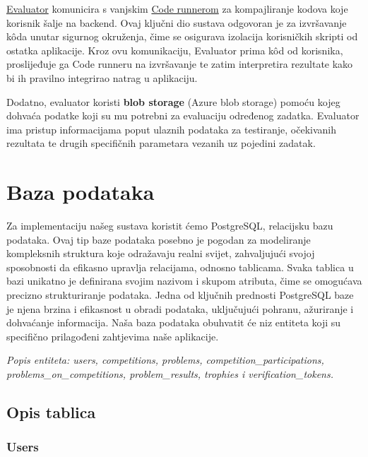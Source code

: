 	{\underline{Evaluator} komunicira s vanjskim \underline{Code runnerom} za kompajliranje kodova koje korisnik šalje
	na backend. Ovaj ključni dio sustava odgovoran je za izvršavanje kôda unutar sigurnog okruženja, čime se osigurava
	izolacija korisničkih skripti od ostatka aplikacije. Kroz ovu komunikaciju, Evaluator prima kôd od korisnika,
	proslijeđuje ga Code runneru na izvršavanje te zatim interpretira rezultate kako bi ih pravilno integrirao
	natrag u aplikaciju.}

	{Dodatno, evaluator koristi \textbf{blob storage} (Azure blob storage) pomoću kojeg dohvaća podatke koji su mu potrebni za
	evaluaciju određenog zadatka. Evaluator ima pristup informacijama poput ulaznih podataka za testiranje,
	očekivanih rezultata te drugih specifičnih parametara vezanih uz pojedini zadatak.}
	
	\newpage
	
		

		

				
		\section{Baza podataka}
		
		Za implementaciju našeg sustava koristit ćemo PostgreSQL, relacijsku bazu podataka. Ovaj tip baze podataka posebno je pogodan za modeliranje kompleksnih struktura koje odražavaju realni svijet, zahvaljujući svojoj sposobnosti da efikasno upravlja relacijama, odnosno tablicama. Svaka tablica u bazi unikatno je definirana svojim nazivom i skupom atributa, čime se omogućava precizno strukturiranje podataka. Jedna od ključnih prednosti PostgreSQL baze je njena brzina i efikasnost u obradi podataka, uključujući pohranu, ažuriranje i dohvaćanje informacija. Naša baza podataka obuhvatit će niz entiteta koji su specifično prilagođeni zahtjevima naše aplikacije.
		
		\textit{Popis entiteta: users, competitions, problems, competition\_participations, problems\_on\_competitions, 
			problem\_results, trophies i verification\_tokens.}
		
		
		\eject
		\subsection{Opis tablica}
		
		
		\subsubsection*{Users}
		
